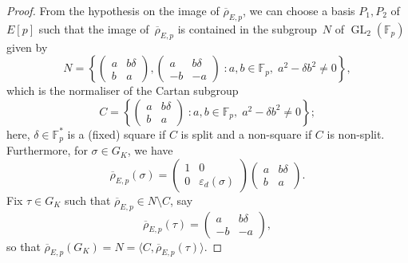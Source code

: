 \documentclass[12pt]{amsart}
\newcommand{\F}{\mathbb{F}}
\newcommand{\rhobar}{{\overline{\rho}}}
\newcommand{\eps}{\varepsilon}
\newcommand{\GL}{\operatorname{GL}}
\numberwithin{equation}{section}
\theoremstyle{definition}
\theoremstyle{remark}
\begin{document}
\begin{proof}
From the hypothesis on the image of $\rhobar_{E,p}$, we can choose a
basis $P_1, P_2$ of $E[p]$ such that the image of~$\rhobar_{E,p}$ is
contained in the subgroup~$N$ of $\GL_2(\F_p)$ given by
\[
N = \left\{ 
\begin{pmatrix}
a & b\delta \\
b & a
\end{pmatrix}, 
\begin{pmatrix}
a & b\delta \\
-b & -a
\end{pmatrix}  \; : a, b \in \F_p, \; a^2 - \delta b^2 \neq 0 \right\},
\]
which is the normaliser of the Cartan subgroup
\[
C = \left\{ 
\begin{pmatrix}
a & b\delta \\
b & a
\end{pmatrix}  \; : a, b \in \F_p, \; a^2 - \delta b^2 \neq 0 \right\};
\]
here, $\delta \in \F_p^*$ is a (fixed) square if $C$ is split and a
non-square if $C$ is non-split.  Furthermore, for $\sigma \in
G_K$, we have
\[
 \rhobar_{E,p}(\sigma) = \begin{pmatrix}1&0\\0&\eps_d(\sigma)\end{pmatrix} 
                            \begin{pmatrix}
                            a & b\delta \\
                            b & a
                            \end{pmatrix}.
                            \]
Fix $\tau \in G_K$ such that $\rhobar_{E,p}\in N\setminus C$, say
\[
 \rhobar_{E,p}(\tau) =  \begin{pmatrix}
                            a & b\delta \\
                            -b & -a
                            \end{pmatrix},
\]
so that $\rhobar_{E,p}(G_K) = N = \langle C,\rhobar_{E,p}(\tau) \rangle$.


\end{proof}
\end{document}
